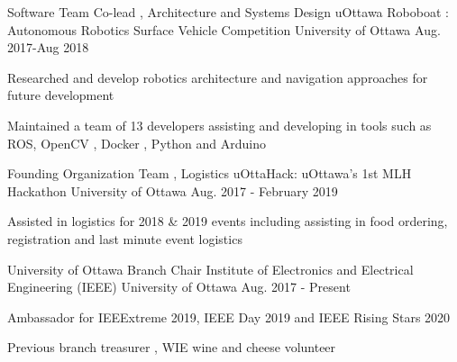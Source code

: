 

\begin{cventries}


  \cventry
    {Software Team Co-lead , Architecture and Systems Design } %
    {uOttawa Roboboat : Autonomous Robotics Surface Vehicle Competition } %
    {University of Ottawa } %
    {Aug. 2017-Aug 2018} %
    {
      \begin{cvitems} %
        \item {Researched and develop robotics architecture and navigation approaches for future development}
        \item { Maintained a team of 13 developers assisting and developing  in tools such as ROS, OpenCV , Docker , Python and Arduino }
      \end{cvitems}    
    }


  \cventry
    {Founding Organization Team , Logistics } %
    {uOttaHack: uOttawa's 1st MLH Hackathon } %
    {University of Ottawa } %
    {Aug. 2017 - February 2019} %
    {
      \begin{cvitems} %
        \item { Assisted in logistics for 2018 \& 2019 events including assisting in food ordering, registration and last minute event logistics }
      \end{cvitems}    
     }

  \cventry
    { University of Ottawa Branch  Chair  } %
    {Institute of Electronics and Electrical Engineering (IEEE) } %
    {University of Ottawa} %
    {Aug. 2017 - Present } %
    {
      \begin{cvitems} %
        \item {Ambassador for IEEExtreme 2019, IEEE Day 2019 and IEEE Rising Stars 2020}
        \item {Previous branch treasurer , WIE wine and cheese volunteer  }
      \end{cvitems}    
    }


\end{cventries}
